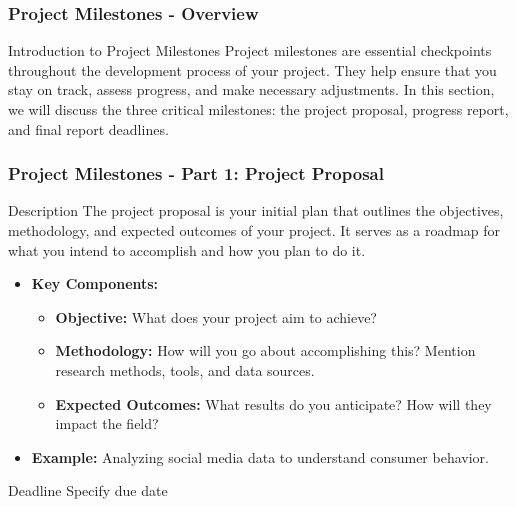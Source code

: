 \documentclass[aspectratio=169]{beamer}
\begin{document}
\begin{frame}[fragile]
    \frametitle{Project Milestones - Overview}
    \begin{block}{Introduction to Project Milestones}
        Project milestones are essential checkpoints throughout the development process of your project. They help ensure that you stay on track, assess progress, and make necessary adjustments. In this section, we will discuss the three critical milestones: the project proposal, progress report, and final report deadlines.
    \end{block}
\end{frame}

\begin{frame}[fragile]
    \frametitle{Project Milestones - Part 1: Project Proposal}
    \begin{block}{Description}
        The project proposal is your initial plan that outlines the objectives, methodology, and expected outcomes of your project. It serves as a roadmap for what you intend to accomplish and how you plan to do it.
    \end{block}

    \begin{itemize}
        \item \textbf{Key Components:}
            \begin{itemize}
                \item \textbf{Objective:} What does your project aim to achieve?
                \item \textbf{Methodology:} How will you go about accomplishing this? Mention research methods, tools, and data sources.
                \item \textbf{Expected Outcomes:} What results do you anticipate? How will they impact the field?
            \end{itemize}
        \item \textbf{Example:} Analyzing social media data to understand consumer behavior.
    \end{itemize}
    
    \begin{block}{Deadline}
        Specify due date
    \end{block}
\end{frame}
\end{document}
